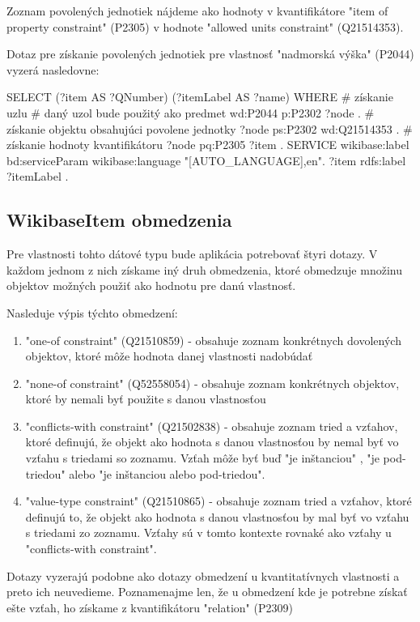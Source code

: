 Zoznam povolených jednotiek nájdeme ako hodnoty v kvantifikátore "item of property constraint" (P2305)
v hodnote "allowed units constraint" (Q21514353).

Dotaz pre získanie povolených jednotiek pre vlastnosť "nadmorská výška" (P2044) vyzerá nasledovne:
\begin{code}
      SELECT  (?item AS ?QNumber) (?itemLabel AS ?name)
      WHERE {
      # získanie uzlu
      # daný uzol bude použitý ako predmet
      wd:P2044 p:P2302 ?node .
      # získanie objektu obsahujúci povolene jednotky
      ?node ps:P2302 wd:Q21514353 .
      # získanie hodnoty kvantifikátoru
      ?node pq:P2305 ?item .
      SERVICE wikibase:label {
      bd:serviceParam wikibase:language "[AUTO_LANGUAGE],en".
      ?item rdfs:label ?itemLabel .
      }
      }
\end{code}

\subsection*{WikibaseItem obmedzenia}
Pre vlastnosti tohto dátové typu bude aplikácia potrebovať štyri dotazy. V každom jednom z nich získame
iný druh obmedzenia, ktoré obmedzuje množinu objektov možných použiť ako hodnotu pre danú vlastnosť.

Nasleduje výpis týchto obmedzení:
\begin{enumerate}
      \item "one-of constraint" (Q21510859) - obsahuje zoznam konkrétnych dovolených objektov, ktoré môže hodnota danej vlastnosti nadobúdať
      \item "none-of constraint" (Q52558054) - obsahuje zoznam konkrétnych objektov, ktoré by nemali byť použite s danou vlastnosťou
      \item "conflicts-with constraint" (Q21502838) - obsahuje zoznam tried a vzťahov,
            ktoré definujú, že objekt ako hodnota s danou vlastnosťou by nemal byť vo vzťahu s triedami so zoznamu.
            Vzťah môže byť buď "je inštanciou" ,
            "je pod-triedou" alebo "je inštanciou alebo pod-triedou".
      \item "value-type constraint" (Q21510865) -
            obsahuje zoznam tried a vzťahov, ktoré definujú to, že objekt ako
            hodnota s danou vlastnosťou by mal byť vo vzťahu s triedami zo zoznamu.
            Vzťahy sú v tomto kontexte rovnaké ako vzťahy u "conflicts-with constraint".
\end{enumerate}

Dotazy vyzerajú podobne ako dotazy obmedzení u kvantitatívnych vlastnosti a preto ich neuvedieme.
Poznamenajme len, že u obmedzení kde je potrebne získať ešte vzťah, ho získame z kvantifikátoru "relation" (P2309)

